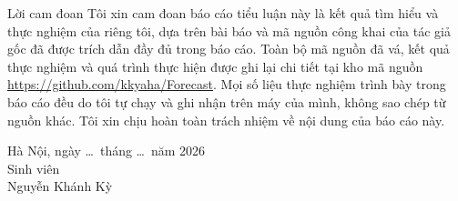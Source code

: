 \begin{preamble}{Lời cam đoan}
Tôi xin cam đoan báo cáo tiểu luận này là kết quả tìm hiểu và thực nghiệm của riêng tôi,
dựa trên bài báo và mã nguồn công khai của tác giả gốc đã được trích dẫn đầy đủ trong báo
cáo. Toàn bộ mã nguồn đã vá, kết quả thực nghiệm và quá trình thực hiện được ghi lại chi
tiết tại kho mã nguồn \url{https://github.com/kkyaha/Forecast}. Mọi số liệu thực nghiệm
trình bày trong báo cáo đều do tôi tự chạy và ghi nhận trên máy của mình, không sao chép từ
nguồn khác. Tôi xin chịu hoàn toàn trách nhiệm về nội dung của báo cáo này.

\vspace{1cm}
\hfill\begin{minipage}{7cm}
\centering
Hà Nội, ngày \dots\ tháng \dots\ năm 2026\\
Sinh viên\\[2cm]
Nguyễn Khánh Kỳ
\end{minipage}
\end{preamble}

